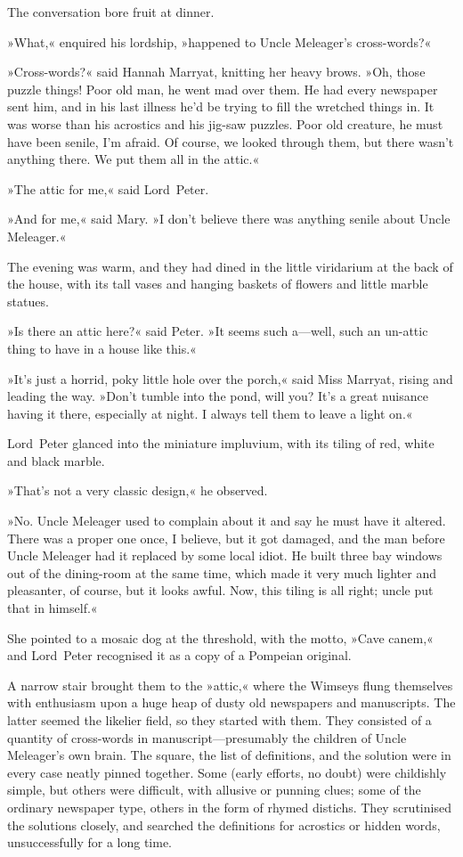 The conversation bore fruit at dinner.

»What,« enquired his lordship, »happened to Uncle Meleager's cross-words?«

»Cross-words?« said Hannah Marryat, knitting her heavy brows. »Oh, those puzzle things! Poor old man, he went mad over them. He had every newspaper sent him, and in his last illness he'd be trying to fill the wretched things in. It was worse than his acrostics and his jig-saw puzzles. Poor old creature, he must have been senile, I'm afraid. Of course, we looked through them, but there wasn't anything there. We put them all in the attic.«

»The attic for me,« said Lord~Peter.

»And for me,« said Mary. »I don't believe there was anything senile about Uncle Meleager.«

The evening was warm, and they had dined in the little viridarium at the back of the house, with its tall vases and hanging baskets of flowers and little marble statues.

»Is there an attic here?« said Peter. »It seems such a—well, such an un-attic thing to have in a house like this.«

»It's just a horrid, poky little hole over the porch,« said Miss Marryat, rising and leading the way. »Don't tumble into the pond, will you? It's a great nuisance having it there, especially at night. I always tell them to leave a light on.«

Lord~Peter glanced into the miniature impluvium, with its tiling of red, white and black marble.

»That's not a very classic design,« he observed.

»No. Uncle Meleager used to complain about it and say he must have it altered. There was a proper one once, I believe, but it got damaged, and the man before Uncle Meleager had it replaced by some local idiot. He built three bay windows out of the dining-room at the same time, which made it very much lighter and pleasanter, of course, but it looks awful. Now, this tiling is all right; uncle put that in himself.«

She pointed to a mosaic dog at the threshold, with the motto, »Cave canem,« and Lord~Peter recognised it as a copy of a Pompeian original.

A narrow stair brought them to the »attic,« where the Wimseys flung themselves with enthusiasm upon a huge heap of dusty old newspapers and manuscripts. The latter seemed the likelier field, so they started with them. They consisted of a quantity of cross-words in manuscript—presumably the children of Uncle Meleager's own brain. The square, the list of definitions, and the solution were in every case neatly pinned together. Some (early efforts, no doubt) were childishly simple, but others were difficult, with allusive or punning clues; some of the ordinary newspaper type, others in the form of rhymed distichs. They scrutinised the solutions closely, and searched the definitions for acrostics or hidden words, unsuccessfully for a long time.

